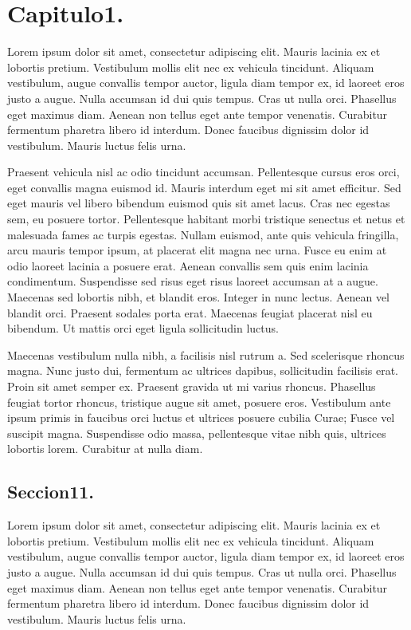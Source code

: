 \chapter{Capitulo1.}\label{cap:capitulo1}

Lorem ipsum dolor sit amet, consectetur adipiscing elit. Mauris lacinia ex et lobortis pretium. Vestibulum mollis elit nec ex vehicula tincidunt. Aliquam vestibulum, augue convallis tempor auctor, ligula diam tempor ex, id laoreet eros justo a augue. Nulla accumsan id dui quis tempus. Cras ut nulla orci. Phasellus eget maximus diam. Aenean non tellus eget ante tempor venenatis. Curabitur fermentum pharetra libero id interdum. Donec faucibus dignissim dolor id vestibulum. Mauris luctus felis urna.

Praesent vehicula nisl ac odio tincidunt accumsan. Pellentesque cursus eros orci, eget convallis magna euismod id. Mauris interdum eget mi sit amet efficitur. Sed eget mauris vel libero bibendum euismod quis sit amet lacus. Cras nec egestas sem, eu posuere tortor. Pellentesque habitant morbi tristique senectus et netus et malesuada fames ac turpis egestas. Nullam euismod, ante quis vehicula fringilla, arcu mauris tempor ipsum, at placerat elit magna nec urna. Fusce eu enim at odio laoreet lacinia a posuere erat. Aenean convallis sem quis enim lacinia condimentum. Suspendisse sed risus eget risus laoreet accumsan at a augue. Maecenas sed lobortis nibh, et blandit eros. Integer in nunc lectus. Aenean vel blandit orci. Praesent sodales porta erat. Maecenas feugiat placerat nisl eu bibendum. Ut mattis orci eget ligula sollicitudin luctus.

Maecenas vestibulum nulla nibh, a facilisis nisl rutrum a. Sed scelerisque rhoncus magna. Nunc justo dui, fermentum ac ultrices dapibus, sollicitudin facilisis erat. Proin sit amet semper ex. Praesent gravida ut mi varius rhoncus. Phasellus feugiat tortor rhoncus, tristique augue sit amet, posuere eros. Vestibulum ante ipsum primis in faucibus orci luctus et ultrices posuere cubilia Curae; Fusce vel suscipit magna. Suspendisse odio massa, pellentesque vitae nibh quis, ultrices lobortis lorem. Curabitur at nulla diam. 



\section{Seccion11.}

Lorem ipsum dolor sit amet, consectetur adipiscing elit. Mauris lacinia ex et lobortis pretium. Vestibulum mollis elit nec ex vehicula tincidunt. Aliquam vestibulum, augue convallis tempor auctor, ligula diam tempor ex, id laoreet eros justo a augue. Nulla accumsan id dui quis tempus. Cras ut nulla orci. Phasellus eget maximus diam. Aenean non tellus eget ante tempor venenatis. Curabitur fermentum pharetra libero id interdum. Donec faucibus dignissim dolor id vestibulum. Mauris luctus felis urna.

